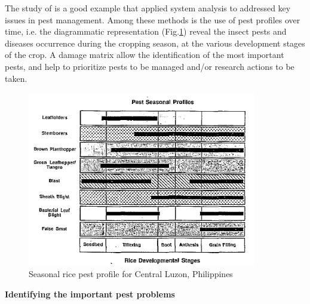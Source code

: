The study of \citet{heong1985systems} is a good example that applied system analysis to addressed key issues in pest management. Among these methods is the use of pest profiles over time, i.e. the diagrammatic representation (Fig.\ref{fig:pest_season_profile}) reveal the insect pests and diseases occurrence during the cropping season, at the various development stages of the crop. A damage matrix allow the identification of the most important pests, and help to prioritize pests to be managed and/or research actions to be taken. 


\begin{figure}
\includegraphics[width=10cm]{pest_season_profile}
\centering
\caption{Seasonal rice pest profile for Central Luzon, Philippines \cite{heong1985systems}}
\label{fig:pest_season_profile}
\end{figure}



\textbf{Identifying the important pest problems}


